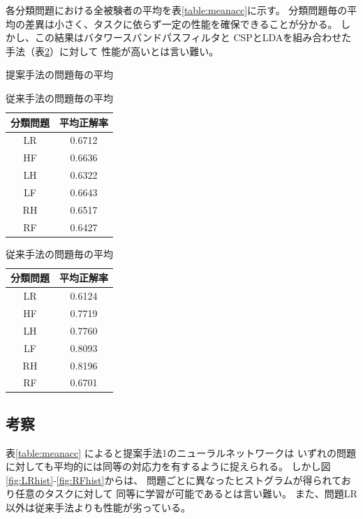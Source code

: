 各分類問題における全被験者の平均を表\ref{table:meanacc}に示す。
分類問題毎の平均の差異は小さく、タスクに依らず一定の性能を確保できることが分かる。
しかし、この結果はバタワースバンドパスフィルタと
CSPとLDAを組み合わせた手法\cite{benth}（表\ref{table:meanacc_csp}）に対して
性能が高いとは言い難い。
\begin{table}[t]
    \begin{minipage}{0.5\hsize}
        \centering
        \caption{提案手法の問題毎の平均}
        \begin{tabular}{|c|c|} \hline
            分類問題 & 平均正解率 \\ \hline
            LR & 0.6712 \\ \hline
            HF & 0.6636 \\ \hline
            LH & 0.6322 \\ \hline
            LF & 0.6643 \\ \hline
            RH & 0.6517 \\ \hline
            RF & 0.6427 \\ \hline
        \end{tabular}
        \label{table:meanacc}
    \end{minipage}
    \begin{minipage}{0.5\hsize}
        \centering
        \caption{従来手法の問題毎の平均}
        \begin{tabular}{|c|c|} \hline
            分類問題 & 平均正解率 \\ \hline
            LR & 0.6124 \\ \hline
            HF & 0.7719 \\ \hline
            LH & 0.7760 \\ \hline
            LF & 0.8093 \\ \hline
            RH & 0.8196 \\ \hline
            RF & 0.6701 \\ \hline
        \end{tabular}
        \label{table:meanacc_csp}
    \end{minipage}
\end{table}

\subsection{\mc 考察}
表\ref{table:meanacc} によると提案手法1のニューラルネットワークは
いずれの問題に対しても平均的には同等の対応力を有するように捉えられる。
しかし図\ref{fig:LRhist}-\ref{fig:RFhist}からは、
問題ごとに異なったヒストグラムが得られており任意のタスクに対して
同等に学習が可能であるとは言い難い。
また、問題LR以外は従来手法よりも性能が劣っている。

